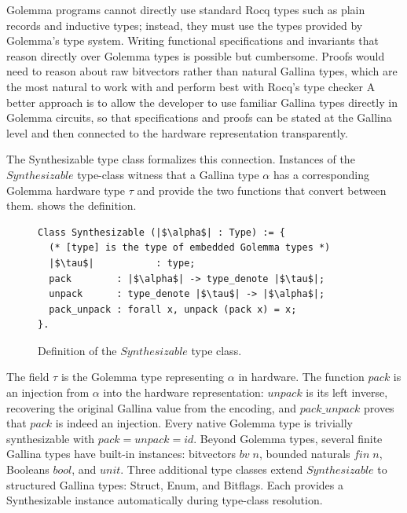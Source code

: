 \documentclass[fontset=fira-newtxsf]{mitthesis}
\theoremstyle{definition}
\theoremstyle{plain}
\begin{document}
Golemma programs cannot directly use standard Rocq types such as plain records and inductive types; instead, they must use the types provided by Golemma's type system.
Writing functional specifications and invariants that reason directly over Golemma types is possible but cumbersome.
Proofs would need to reason about raw bitvectors rather than natural Gallina types, which are the most natural to work with and perform best with Rocq's type checker
A better approach is to allow the developer to use familiar Gallina types directly in Golemma circuits, so that specifications and proofs can be stated at the Gallina level and then connected to the hardware representation transparently.

The Synthesizable type class formalizes this connection.
Instances of the $\mathit{Synthesizable}$ type-class witness that a Gallina type $\alpha$ has a corresponding Golemma hardware type $\tau$ and provide the two functions that convert between them.
 shows the definition.

\begin{figure}[H]
\begin{verbatim}
Class Synthesizable (|$\alpha$| : Type) := {
  (* [type] is the type of embedded Golemma types *)
  |$\tau$|           : type;
  pack        : |$\alpha$| -> type_denote |$\tau$|;
  unpack      : type_denote |$\tau$| -> |$\alpha$|;
  pack_unpack : forall x, unpack (pack x) = x;
}.
\end{verbatim}
\caption[Synthesizable type class]{Definition of the $\mathit{Synthesizable}$ type class.}
\label{fig:synth-class}
\end{figure}

The field $\tau$ is the Golemma type representing $\alpha$ in hardware.
The function $\mathit{pack}$ is an injection from $\alpha$ into the hardware representation: $\mathit{unpack}$ is its left inverse, recovering the original Gallina value from the encoding, and $\mathit{pack\_unpack}$ proves that $\mathit{pack}$ is indeed an injection.
Every native Golemma type is trivially synthesizable with $\mathit{pack} = \mathit{unpack} = \mathit{id}$.
Beyond Golemma types, several finite Gallina types have built-in instances: bitvectors $\mathit{bv}\;\mathit{n}$, bounded naturals $\mathit{fin}\;\mathit{n}$, Booleans $\mathit{bool}$, and $\mathit{unit}$.
Three additional type classes extend $\mathit{Synthesizable}$ to structured Gallina types: Struct, Enum, and Bitflags.
Each provides a Synthesizable instance automatically during type-class resolution.
\end{document}
